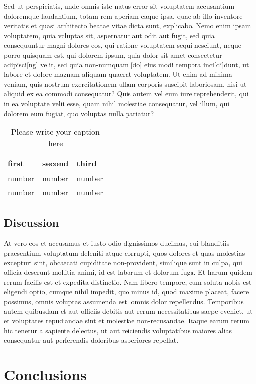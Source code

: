 Sed ut perspiciatis, unde omnis iste natus error sit voluptatem accusantium doloremque laudantium, totam rem aperiam eaque ipsa, quae ab illo inventore veritatis et quasi architecto beatae vitae dicta sunt, explicabo. Nemo enim ipsam voluptatem, quia voluptas sit, aspernatur aut odit aut fugit, sed quia consequuntur magni dolores eos, qui ratione voluptatem sequi nesciunt, neque porro quisquam est, qui dolorem ipsum, quia dolor sit amet consectetur adipisci[ng] velit, sed quia non-numquam [do] eius modi tempora inci[di]dunt, ut labore et dolore magnam aliquam quaerat voluptatem. Ut enim ad minima veniam, quis nostrum exercitationem ullam corporis suscipit laboriosam, nisi ut aliquid ex ea commodi consequatur? Quis autem vel eum iure reprehenderit, qui in ea voluptate velit esse, quam nihil molestiae consequatur, vel illum, qui dolorem eum fugiat, quo voluptas nulla pariatur?

\begin{table}[htbp]
\caption{Please write your caption here}
\centering
\begin{tabular}{lll}
first & second & third\\
\hline
number & number & number\\
number & number & number\\
\end{tabular}
\end{table}

\subsection*{Discussion}
\label{sec:org888897b}

At vero eos et accusamus et iusto odio dignissimos ducimus, qui blanditiis praesentium voluptatum deleniti atque corrupti, quos dolores et quas molestias excepturi sint, obcaecati cupiditate non-provident, similique sunt in culpa, qui officia deserunt mollitia animi, id est laborum et dolorum fuga. Et harum quidem rerum facilis est et expedita distinctio. Nam libero tempore, cum soluta nobis est eligendi optio, cumque nihil impedit, quo minus id, quod maxime placeat, facere possimus, omnis voluptas assumenda est, omnis dolor repellendus. Temporibus autem quibusdam et aut officiis debitis aut rerum necessitatibus saepe eveniet, ut et voluptates repudiandae sint et molestiae non-recusandae. Itaque earum rerum hic tenetur a sapiente delectus, ut aut reiciendis voluptatibus maiores alias consequatur aut perferendis doloribus asperiores repellat.

\section*{Conclusions}
\label{sec:orgb948c0e}

